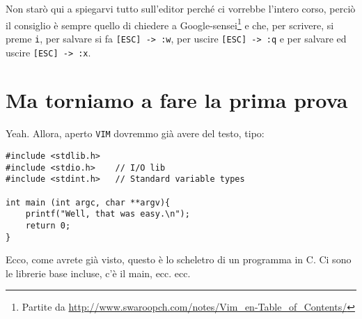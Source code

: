 \documentclass[a4paper]{memoir}
\begin{document}
        Non starò qui a spiegarvi tutto sull'editor perché ci vorrebbe l'intero corso, perciò il consiglio è sempre
        quello di chiedere a Google-sensei\footnote{Partite da \url{http://www.swaroopch.com/notes/Vim_en-Table_of_Contents/}}
        e che, per scrivere, si preme \texttt{i}, per salvare si fa \texttt{[ESC] -> :w}, per uscire \texttt{[ESC] -> :q} 
        e per salvare ed uscire \texttt{[ESC] -> :x}.
        
	\section{Ma torniamo a fare la prima prova}
		
		Yeah. Allora, aperto \texttt{VIM} dovremmo già avere del testo, tipo:
		
	    \begin{Verbatim}[label={UNF, DAT syntax highlighting (dentro VIM)}]
#include <stdlib.h>
#include <stdio.h>    // I/O lib
#include <stdint.h>   // Standard variable types

int main (int argc, char **argv){
    printf("Well, that was easy.\n");
    return 0;
}
		\end{Verbatim}
		
		Ecco, come avrete già visto, questo è lo scheletro di un programma in C. Ci sono le librerie base incluse,
		c'è il main, ecc. ecc.
\end{document}
